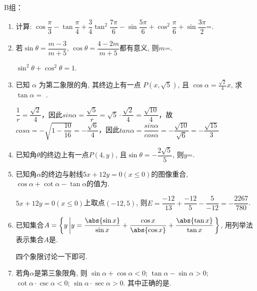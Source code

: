 B组：
\begin{enumerate}
\item 计算: $\cos\dfrac{\pi}{3}-\tan\dfrac{\pi}{4}+\dfrac{3}{4}\tan^2\dfrac{7\pi}{6}-\sin\dfrac{5\pi}{6}+\cos^2\dfrac{\pi}{6}+\sin\dfrac{3\pi}{2}$=. 

\item 若$\sin\theta=\dfrac{m-3}{m+5}$, $\cos\theta=\dfrac{4-2m}{m+5}$都有意义, 则$m$=. 
\begin{jieda}
$\sin^2\theta+\cos^2\theta=1$. 
\end{jieda}


\item 已知 $\alpha$ 为第二象限的角, 其终边上有一点 $P\left(x, \sqrt{5}\right)$, 且 $\cos \alpha=\frac{\sqrt{2}}{4} x$, 求 $\tan \alpha =$ .
\begin{jieda}
    $\dfrac{1}{r} = \dfrac{\sqrt{2}}{4}$，因此$sin\alpha = \dfrac{\sqrt{5}}{r} = \sqrt{5} \cdot \dfrac{\sqrt{2}}{4} = \dfrac{\sqrt{10}}{4}$，故$cos\alpha = -\sqrt{1 - \dfrac{10}{16}} = -\dfrac{\sqrt{6}}{4}$，因此$tan\alpha = \dfrac{sin\alpha}{cos\alpha} = -\dfrac{\sqrt{10}}{\sqrt{6}} = -\dfrac{\sqrt{15}}{3}$
\end{jieda}


\item 已知角$\theta$的终边上有一点$P\left(4,y\right)$, 且$\sin\theta=-\dfrac{2\sqrt{5}}{5}$, 则$y$=. 

\item 已知角$\alpha$的终边与射线$5x+12y=0\left(x\leq 0\right)$的图像重合, $\cos\alpha+\cot\alpha-\tan\alpha$的值为. 
\begin{jieda}
$5x+12y=0\left(x\leq 0\right)$上取点$\left(-12,5\right)$, 
则$E=\dfrac{-12}{13}+\dfrac{-12}{5}-\dfrac{5}{-12}=-\dfrac{2267}{780}$. 
\end{jieda}


\item 已知集合$A=\left\{y \left| y=\dfrac{\abs{\sin{x}}}{\sin{x}}+\dfrac{\cos{x}}{\abs{\cos{x}}}+\dfrac{\abs{\tan{x}}}{\tan{x}}\right.\right\}$, 
用列举法表示集合$A$是. 
\begin{jieda}
四个象限讨论一下即可. 
\end{jieda}


\item 若角$\alpha$是第三象限角, 则
 $\sin\alpha+\cos\alpha<0$; 
 $\tan\alpha-\sin\alpha>0$; 
 $\cot\alpha\cdot\csc\alpha<0$; 
 $\sin\alpha\cdot\sec\alpha>0$. 
其中正确的是.  


\end{enumerate}
